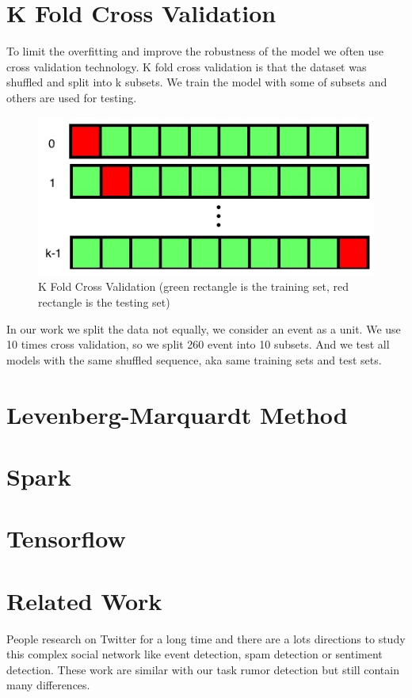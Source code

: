 \section{K Fold Cross Validation } 
To limit the overfitting and improve the robustness of the model we often use cross validation technology. K fold cross validation is that the dataset was shuffled and split into k subsets. We train the model with some of subsets and others are used for testing.
\begin{figure}[!h]
\centering
\includegraphics[width=0.55\columnwidth]{images/CrossV.png}
\caption{K Fold Cross Validation (green rectangle is the training set, red rectangle is the testing set)  }
\label{fig:GRU}
\end{figure}

In our work we split the data not equally, we consider an event as a unit.  We use 10 times cross validation, so we split 260 event into 10 subsets. And we test all models with the same shuffled sequence, aka same training sets and test sets.

\section{Levenberg-Marquardt Method} %
\label{sec:LM}

\section{Spark } %
\section{Tensorflow } %

\section{Related Work } %
People research on Twitter for a long time and there are a lots directions  to study this complex social network like event detection\cite{kimmey2015twitter}, spam detection \cite{ahmed2012mcl} \cite{wang2010don} or sentiment detection\cite{barbosa2010robust}. These work are similar with our task rumor detection but still contain many differences.

